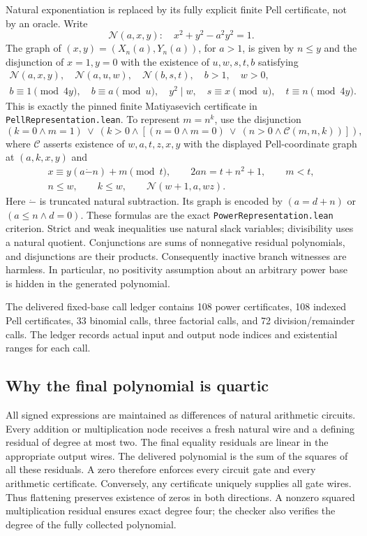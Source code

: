 Natural exponentiation is replaced by its fully explicit finite Pell
certificate, not by an oracle. Write
\[
 \mathcal N(a,x,y):\quad x^2+y^2-a^2y^2=1.
\]
The graph of $(x,y)=(X_n(a),Y_n(a))$, for $a>1$, is given by $n\leq y$
and the disjunction of $x=1,y=0$ with the existence of $u,w,s,t,b$ satisfying
\begin{gather*}
 \mathcal N(a,x,y),\quad \mathcal N(a,u,w),\quad \mathcal N(b,s,t),
 \quad b>1,\quad w>0,\\
 b\equiv1\pmod{4y},\quad b\equiv a\pmod u,\quad y^2\mid w,
 \quad s\equiv x\pmod u,\quad t\equiv n\pmod{4y}.
\end{gather*}
This is exactly the pinned finite Matiyasevich certificate in
\texttt{PellRepresentation.lean}. To represent $m=n^k$, use the disjunction
\[
 (k=0\land m=1)\ \lor\
 \left(k>0\land\left[(n=0\land m=0)\ \lor\
       (n>0\land\mathcal C(m,n,k))\right]\right),
\]
where $\mathcal C$ asserts existence of $w,a,t,z,x,y$ with the displayed
Pell-coordinate graph at $(a,k,x,y)$ and
\begin{gather*}
 x\equiv y(a\mathbin{\dot-}n)+m\pmod t,\qquad
 2an=t+n^2+1,\qquad m<t,\\
 n\leq w,\qquad k\leq w,\qquad \mathcal N(w+1,a,wz).
\end{gather*}
Here $\dot-$ is truncated natural subtraction. Its graph is encoded by
$(a=d+n)$ or $(a\leq n\land d=0)$. These formulas are the exact
\texttt{PowerRepresentation.lean} criterion. Strict and weak inequalities
use natural slack variables; divisibility uses a natural quotient.
Conjunctions are sums of nonnegative residual polynomials, and
disjunctions are their products. Consequently inactive branch witnesses
are harmless. In particular, no positivity assumption about an arbitrary
power base is hidden in the generated polynomial.

The delivered fixed-base call ledger contains 108 power certificates,
108 indexed Pell certificates, 33 binomial calls, three factorial calls,
and 72 division/remainder calls. The ledger records actual input and output
node indices and existential ranges for each call.

\subsection{Why the final polynomial is quartic}

All signed expressions are maintained as differences of natural
arithmetic circuits. Every addition or multiplication node receives a
fresh natural wire and a defining residual of degree at most two.
The final equality residuals are linear in the appropriate output wires.
The delivered polynomial is the sum of the squares of all these residuals.
A zero therefore enforces every circuit gate and every arithmetic
certificate. Conversely, any certificate uniquely supplies all gate
wires. Thus flattening preserves existence of zeros in both directions.
A nonzero squared multiplication residual ensures exact degree four;
the checker also verifies the degree of the fully collected polynomial.

